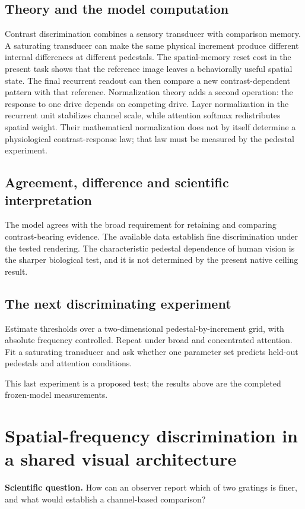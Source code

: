 \documentclass[11pt]{article}
\begin{document}
\subsection{Theory and the model computation}
Contrast discrimination combines a sensory transducer with comparison memory. A saturating transducer can make the same physical increment produce different internal differences at different pedestals. The spatial-memory reset cost in the present task shows that the reference image leaves a behaviorally useful spatial state. The final recurrent readout can then compare a new contrast-dependent pattern with that reference. Normalization theory adds a second operation: the response to one drive depends on competing drive. Layer normalization in the recurrent unit stabilizes channel scale, while attention softmax redistributes spatial weight. Their mathematical normalization does not by itself determine a physiological contrast-response law; that law must be measured by the pedestal experiment. \cite{bio_normalization}

\subsection{Agreement, difference and scientific interpretation}
The model agrees with the broad requirement for retaining and comparing contrast-bearing evidence. The available data establish fine discrimination under the tested rendering. The characteristic pedestal dependence of human vision is the sharper biological test, and it is not determined by the present native ceiling result.

\subsection{The next discriminating experiment}
Estimate thresholds over a two-dimensional pedestal-by-increment grid, with absolute frequency controlled. Repeat under broad and concentrated attention. Fit a saturating transducer and ask whether one parameter set predicts held-out pedestals and attention conditions.

This last experiment is a proposed test; the results above are the completed frozen-model measurements.
\clearpage\section{Spatial-frequency discrimination in a shared visual architecture}
\textbf{Scientific question.} How can an observer report which of two gratings is finer, and what would establish a channel-based comparison?
\end{document}
